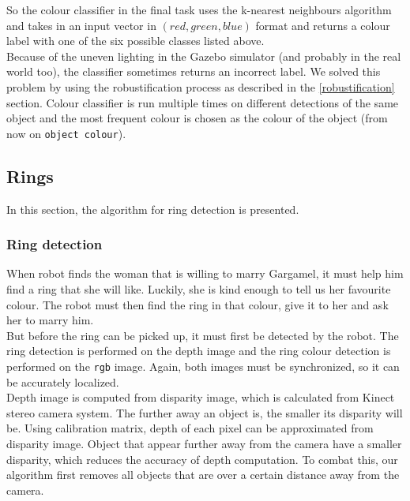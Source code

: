 \documentclass[12pt,a4paper]{article}
\begin{document}
	So the colour classifier in the final task uses the k-nearest neighbours algorithm and takes in an input vector in $(red, green, blue)$ format and returns a colour label with one of the six possible classes listed above. \\
	
	Because of the uneven lighting in the Gazebo simulator (and probably in the real world too), the classifier sometimes returns an incorrect label. We solved this problem by using the robustification process as described in the \ref{robustification} section. Colour classifier is run multiple times on different detections of the same object and the most frequent colour is chosen as the colour of the object (from now on \texttt{object colour}). \\
	
	\subsection{Rings}
	In this section, the algorithm for ring detection is presented.
	
	\subsubsection{Ring detection} \label{ring_detection}
	When robot finds the woman that is willing to marry Gargamel, it must help him find a ring that she will like. Luckily, she is kind enough to tell us her favourite colour. The robot must then find the ring in that colour, give it to her and ask her to marry him. \\
	
	But before the ring can be picked up, it must first be detected by the robot. The ring detection is performed on the depth image and the ring colour detection is performed on the \texttt{rgb} image. Again, both images must be synchronized, so it can be accurately localized. \\
	
	Depth image is computed from disparity image, which is calculated from Kinect stereo camera system. The further away an object is, the smaller its disparity will be. Using calibration matrix, depth of each pixel can be approximated from disparity image. Object that appear further away from the camera have a smaller disparity, which reduces the accuracy of depth computation. To combat this, our algorithm first removes all objects that are over a certain distance away from the camera. \\
	
\end{document}
